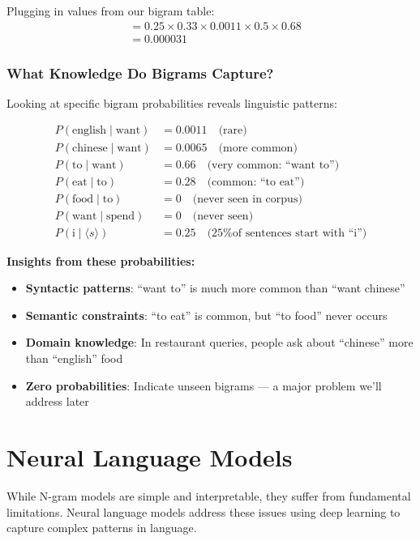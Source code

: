 \documentclass[11pt,a4paper]{article}
\theoremstyle{definition}
\theoremstyle{plain}
\theoremstyle{remark}
\begin{document}
Plugging in values from our bigram table:
\begin{align*}
&= 0.25 \times 0.33 \times 0.0011 \times 0.5 \times 0.68 \\
&= 0.000031
\end{align*}

\subsubsection{What Knowledge Do Bigrams Capture?}

Looking at specific bigram probabilities reveals linguistic patterns:

\begin{align*}
P(\text{english} \mid \text{want}) &= 0.0011 \quad \text{(rare)} \\
P(\text{chinese} \mid \text{want}) &= 0.0065 \quad \text{(more common)} \\
P(\text{to} \mid \text{want}) &= 0.66 \quad \text{(very common: ``want to'')} \\
P(\text{eat} \mid \text{to}) &= 0.28 \quad \text{(common: ``to eat'')} \\
P(\text{food} \mid \text{to}) &= 0 \quad \text{(never seen in corpus)} \\
P(\text{want} \mid \text{spend}) &= 0 \quad \text{(never seen)} \\
P(\text{i} \mid \langle s \rangle) &= 0.25 \quad \text{(25\% of sentences start with ``i'')}
\end{align*}

\textbf{Insights from these probabilities:}
\begin{itemize}
    \item \textbf{Syntactic patterns}: ``want to'' is much more common than ``want chinese''
    \item \textbf{Semantic constraints}: ``to eat'' is common, but ``to food'' never occurs
    \item \textbf{Domain knowledge}: In restaurant queries, people ask about ``chinese'' more than ``english'' food
    \item \textbf{Zero probabilities}: Indicate unseen bigrams — a major problem we'll address later
\end{itemize}

\section{Neural Language Models}

While N-gram models are simple and interpretable, they suffer from fundamental limitations. Neural language models address these issues using deep learning to capture complex patterns in language.
\end{document}
